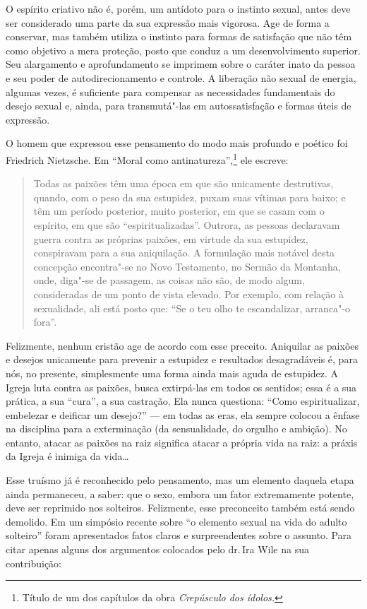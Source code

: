 O espírito criativo não é, porém, um antídoto para o instinto sexual,
antes deve ser considerado uma parte da sua expressão mais vigorosa.
Age de forma a conservar, mas também utiliza o instinto para formas de
satisfação que não têm como objetivo a mera proteção, posto que
conduz a um desenvolvimento superior. Seu alargamento e
aprofundamento se imprimem sobre o caráter inato da pessoa e seu poder
de autodirecionamento e controle. A liberação não sexual de energia,
algumas vezes, é suficiente para compensar as necessidades fundamentais
do desejo sexual e, ainda, para transmutá"-las em autossatisfação e
formas úteis de expressão.

O homem que expressou esse pensamento do modo mais profundo e poético
foi Friedrich Nietzsche. Em ``Moral como antinatureza'',\footnote{Título
  de um dos capítulos da obra \emph{Crepúsculo dos ídolos.}} ele
escreve:

\begin{quote}
Todas as paixões têm uma época em que são unicamente destrutivas,
quando, com o peso da sua estupidez, puxam suas vítimas para baixo; e
têm um período posterior, muito posterior, em que se casam com o
espírito, em que são ``espiritualizadas''. Outrora, as pessoas
declaravam guerra contra as próprias paixões, em virtude da sua
estupidez, conspiravam para a sua aniquilação. A formulação mais notável
desta concepção encontra"-se no Novo Testamento, no Sermão da Montanha,
onde, diga"-se de passagem, as coisas não são, de modo algum,
consideradas de um ponto de vista elevado. Por exemplo, com relação à
sexualidade, ali está posto que: ``Se o teu olho te escandalizar,
arranca"-o fora''.
\end{quote}

Felizmente, nenhum cristão age de acordo com esse preceito. Aniquilar as
paixões e desejos unicamente para prevenir a estupidez e resultados
desagradáveis é, para nós, no presente, simplesmente uma forma ainda
mais aguda de estupidez. A Igreja luta contra as paixões,
busca extirpá-las em todos os sentidos; essa é a sua prática, a sua ``cura'', a
sua castração. Ela nunca questiona: ``Como espiritualizar, embelezar e
deificar um desejo?'' --- em todas as eras, ela sempre colocou a ênfase
na disciplina para a exterminação (da sensualidade, do orgulho e
ambição). No entanto, atacar as paixões na raiz significa atacar a
própria vida na raiz: a práxis da Igreja é inimiga da vida\ldots{}

Esse truísmo já é reconhecido pelo pensamento, mas um elemento daquela
etapa ainda permaneceu, a saber: que o sexo, embora um fator
extremamente potente, deve ser reprimido nos solteiros.
Felizmente, esse preconceito também está sendo demolido. Em um simpósio
recente sobre ``o elemento sexual na vida do adulto solteiro'' foram
apresentados fatos claros e surpreendentes sobre o assunto. Para citar
apenas alguns dos argumentos colocados pelo dr.\,Ira Wile na sua contribuição:

